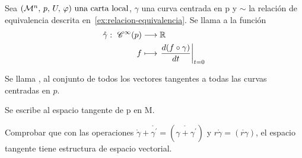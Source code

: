\begin{definition}
  Sea $(\mathcal{M}^n,\thinspace p,\thinspace U,\thinspace \varphi)\textmd{ una carta local}$, $\gamma$ una curva centrada en p y $\sim$ la relación de equivalencia
  descrita en~\ref{ex:relacion-equivalencia}.
  Se llama  a la
  función
  \begin{equation}
    \label{eq:vector-tangente-curva}
    \begin{alignedat}{1}
      \mathring{\gamma}:\ \mathscr{C}^\infty(p) & \longrightarrow \mathbb{R} \\ f & \longmapsto \left.\frac{d(f\circ\gamma)}{dt}\right|_{t=0}
    \end{alignedat}
  \end{equation}
\end{definition}
\begin{definition}
  Se llama , al
  conjunto de todos los vectores tangentes a todas las curvas centradas en $p$.
\end{definition}
\begin{notation}
  Se escribe  al espacio tangente
  de p en M.
\end{notation}

\begin{exercise}
  Comprobar que con las operaciones $\mathring{\gamma}+\mathring{\gamma^\prime}=
  (\mathring{\gamma+\gamma^\prime})$ y $r\mathring{\gamma}=(\mathring{r\gamma})$, el espacio
  tangente tiene estructura de espacio vectorial.
\end{exercise}

